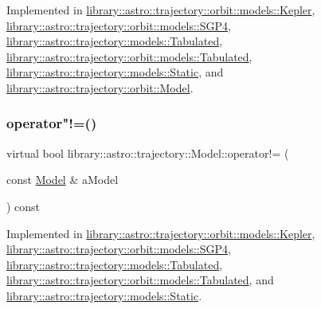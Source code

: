 Implemented in \hyperlink{classlibrary_1_1astro_1_1trajectory_1_1orbit_1_1models_1_1_kepler_a600d7752a50924ee6e3fc08f18a229e9}{library\+::astro\+::trajectory\+::orbit\+::models\+::\+Kepler}, \hyperlink{classlibrary_1_1astro_1_1trajectory_1_1orbit_1_1models_1_1_s_g_p4_a2d70ef4601e453156a430115e11ce8d7}{library\+::astro\+::trajectory\+::orbit\+::models\+::\+S\+G\+P4}, \hyperlink{classlibrary_1_1astro_1_1trajectory_1_1models_1_1_tabulated_ae967e30f6de74405671f992a5920883f}{library\+::astro\+::trajectory\+::models\+::\+Tabulated}, \hyperlink{classlibrary_1_1astro_1_1trajectory_1_1orbit_1_1models_1_1_tabulated_af68120eb6651e8461c02a465923e533f}{library\+::astro\+::trajectory\+::orbit\+::models\+::\+Tabulated}, \hyperlink{classlibrary_1_1astro_1_1trajectory_1_1models_1_1_static_a41449e98bb076e0601df67b1cfbff6b8}{library\+::astro\+::trajectory\+::models\+::\+Static}, and \hyperlink{classlibrary_1_1astro_1_1trajectory_1_1orbit_1_1_model_a518785603421d259e427bd0a6ee5e787}{library\+::astro\+::trajectory\+::orbit\+::\+Model}.

\mbox{\label{classlibrary_1_1astro_1_1trajectory_1_1_model_a476c234f5fca1eb75f64f5a96fd83c61}} 
\subsubsection{\texorpdfstring{operator"!=()}{operator!=()}}
{\footnotesize\ttfamily virtual bool library\+::astro\+::trajectory\+::\+Model\+::operator!= (\begin{DoxyParamCaption}\item[{const \hyperlink{classlibrary_1_1astro_1_1trajectory_1_1_model}{Model} \&}]{a\+Model }\end{DoxyParamCaption}) const\hspace{0.3cm}{\ttfamily [pure virtual]}}



Implemented in \hyperlink{classlibrary_1_1astro_1_1trajectory_1_1orbit_1_1models_1_1_kepler_a2671d995d476b11a14cc08aad2dc0b30}{library\+::astro\+::trajectory\+::orbit\+::models\+::\+Kepler}, \hyperlink{classlibrary_1_1astro_1_1trajectory_1_1orbit_1_1models_1_1_s_g_p4_addbc5d1289986a6f89da00a21d4ab8e6}{library\+::astro\+::trajectory\+::orbit\+::models\+::\+S\+G\+P4}, \hyperlink{classlibrary_1_1astro_1_1trajectory_1_1models_1_1_tabulated_ae6b286af87f28d080b523fb879b74109}{library\+::astro\+::trajectory\+::models\+::\+Tabulated}, \hyperlink{classlibrary_1_1astro_1_1trajectory_1_1orbit_1_1models_1_1_tabulated_a4373b98c6026c999da98e1740c784e17}{library\+::astro\+::trajectory\+::orbit\+::models\+::\+Tabulated}, and \hyperlink{classlibrary_1_1astro_1_1trajectory_1_1models_1_1_static_aadcfd4ac66cc3fc4cc2b868b9bbc182a}{library\+::astro\+::trajectory\+::models\+::\+Static}.

